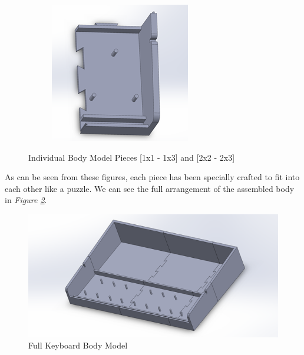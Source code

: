 \begin{figure}[h!]
\begin{subfigure}[b]{0.45\textwidth}
    \centering
    \includegraphics[width=\textwidth]{image/BodyModel8.png}
  \end{subfigure}
  \caption{Individual Body Model Pieces [1x1 - 1x3] and [2x2 - 2x3]}
  \label{fig:body_parts}
\end{figure}

As can be seen from these figures, each piece has been specially crafted to fit into each other like a puzzle. We can see the full arrangement of the assembled body in \textit{Figure \ref{fig:assembled_body}}.

\begin{figure}[h!]
  \centering
  \includegraphics[width=0.9\linewidth]{image/AssembledBody.png}
  \caption{Full Keyboard Body Model}
  \label{fig:assembled_body}
\end{figure}

